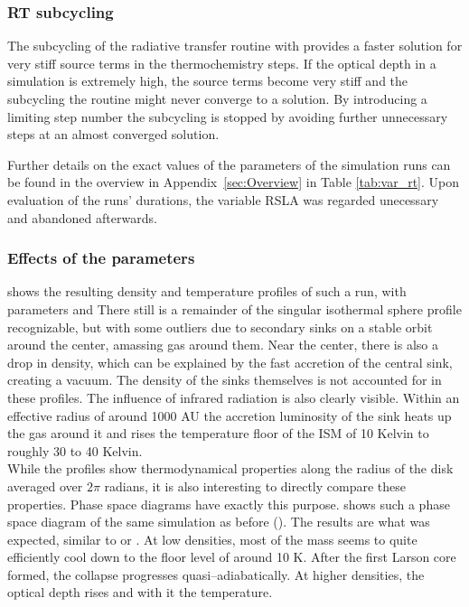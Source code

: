 \subsubsection{RT subcycling}
The subcycling of the radiative transfer routine with  provides a faster solution for very stiff source terms in the thermochemistry steps.
If the optical depth in a simulation is extremely high, the source terms become very stiff and the subcycling the routine might never converge to a solution.
By introducing a limiting step number  the subcycling is stopped by avoiding further unnecessary steps at an almost converged solution.

Further details on the exact values of the parameters of the simulation runs can be found in the overview in Appendix~\ref{sec:Overview} in Table \ref{tab:var_rt}.
Upon evaluation of the runs' durations, the variable RSLA was regarded unecessary and abandoned afterwards.

\subsubsection{Effects of the parameters}
 shows the resulting density and temperature profiles of such a run, with parameters  and 
There still is a remainder of the singular isothermal sphere profile recognizable, but with some outliers due to secondary sinks on a stable orbit around the center, amassing gas around them.
Near the center, there is also a drop in density, which can be explained by the fast accretion of the central sink, creating a vacuum.
The density of the sinks themselves is not accounted for in these profiles.
The influence of infrared radiation is also clearly visible.
Within an effective radius of around 1000 AU the accretion luminosity of the sink heats up the gas around it and rises the temperature floor of the ISM of 10 Kelvin to roughly 30 to 40 Kelvin.
\\[6pt]
%
While the profiles show thermodynamical properties along the radius of the disk averaged over $2\pi$ radians, it is also interesting to directly compare these properties.
Phase space diagrams have exactly this purpose.
 shows such a phase space diagram of the same simulation as before ().
The results are what was expected, similar to \citet{Commercon_collapse} or \citet{Larson_paper}.
At low densities, most of the mass seems to quite efficiently cool down to the floor level of around 10 K.
After the first Larson core formed, the collapse progresses quasi--adiabatically.
At higher densities, the optical depth rises and with it the temperature.


